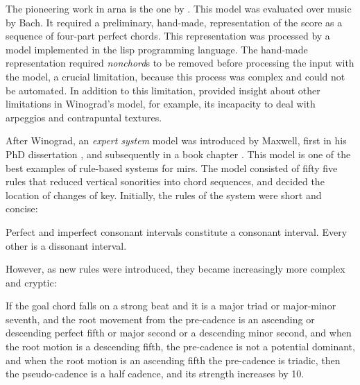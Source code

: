 


The pioneering work in \gls{arna} is the one by
\textcite{winograd1968linguistics}. This model was evaluated
over music by Bach. It required a preliminary, hand-made,
representation of the score as a sequence of four-part
perfect chords. This representation was processed by a model
implemented in the \gls{lisp} programming language. The
hand-made representation required \emph{nonchord}s to be
removed before processing the input with the model, a
crucial limitation, because this process was complex and
could not be automated. In addition to this limitation,
\textcite{temperley1997algorithm} provided insight about
other limitations in Winograd's model, for example, its
incapacity to deal with arpeggios and contrapuntal textures.

After Winograd, an \emph{expert system} model was introduced
by Maxwell, first in his PhD dissertation
\parencite{maxwell1984artificial}, and subsequently in a
book chapter \parencite{maxwell1992expert}. This model is
one of the best examples of rule-based systems for
\glspl{mir}. The model consisted of fifty five rules that
reduced vertical sonorities into chord sequences, and
decided the location of changes of key. Initially, the rules
of the system were short and concise:

\begin{italicquotes}
    Perfect and imperfect consonant intervals constitute a
    consonant interval. Every other is a dissonant interval.
\end{italicquotes}

However, as new rules were introduced, they became
increasingly more complex and cryptic:

\begin{italicquotes}
    If the goal chord falls on a strong beat and it is a
    major triad or major-minor seventh, and the root
    movement from the pre-cadence is an ascending or
    descending perfect fifth or major second or a descending
    minor second, and when the root motion is a descending
    fifth, the pre-cadence is not a potential dominant, and
    when the root motion is an ascending fifth the
    pre-cadence is triadic, then the pseudo-cadence is a
    half cadence, and its strength increases by 10.
\end{italicquotes}

